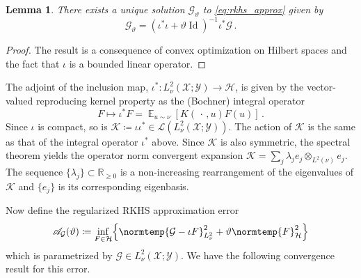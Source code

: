 \documentclass{article}
\theoremstyle{plain}
\newtheorem{lemma}[theorem]{Lemma}
\theoremstyle{my_def}
\theoremstyle{my_rem}
\numberwithin{equation}{section}
\numberwithin{theorem}{section}%
\newcommand{\R}{\mathbb{R}}
\newcommand{\E}{\mathbb{E}}
\newcommand{\scrA}{\mathscr{A}}
\newcommand{\cG}{\mathcal{G}}
\newcommand{\cH}{\mathcal{H}}
\newcommand{\cK}{\mathcal{K}}
\newcommand{\cL}{\mathcal{L}}
\newcommand{\cX}{\mathcal{X}}
\newcommand{\cY}{\mathcal{Y}}
\let\originalleft\left %
\let\originalright\right
\renewcommand{\left}{\mathopen{}\mathclose\bgroup\originalleft}
\renewcommand{\right}{\aftergroup\egroup\originalright}
\newcommand{\norm}{\normtemp}
\newcommand{\slot}{{\,\cdot\,}}
\newcommand{\defeq}{\coloneqq} %
\DeclareMathOperator{\Id}{Id} %
\renewcommand{\E}{\operatorname{\mathbb{E}}} %
\begin{document}
\begin{lemma}
\label{lem:rkhs_approx_soln}
    There exists a unique solution $\cG_\vartheta$ to \eqref{eq:rkhs_approx} given by
    \begin{equation}\label{eq:rkhs_approx_soln}
        \cG_\vartheta = (\iota^*\iota + \vartheta \Id)^{-1}\iota^*\cG\,.
    \end{equation}
\end{lemma}
\begin{proof}
    The result is a consequence of convex optimization on Hilbert spaces and the fact that $\iota$ is a bounded linear operator.
\end{proof}

The adjoint of the inclusion map, $\iota^*\colon L^2_\nu(\cX;\cY)\to \cH$, is given by the vector-valued reproducing kernel property as the (Bochner) integral operator
\begin{equation}\label{eq:app_rkhs_cov}
    F\mapsto \iota^*F=\E_{u\sim\nu}[K(\slot,u)F(u)]\,.
\end{equation}
Since $\iota$ is compact, so is $\cK\defeq \iota\iota^*\in\cL(L^2_\nu(\cX;\cY))$. The action of $\cK$ is the same as that of the integral operator $\iota^*$ above. Since $\cK$ is also symmetric, the spectral theorem yields the operator norm convergent expansion $\cK=\sum_j\lambda_je_j\otimes_{L^2(\nu)}e_j$. The sequence $\{\lambda_j\}\subset \R_{\geq 0}$ is a non-increasing rearrangement of the eigenvalues of $\cK$ and $\{e_j\}$ is its corresponding eigenbasis. 

Now define the regularized RKHS approximation error
\begin{equation}\label{eq:scrA_rkhs}
    \scrA_\cG(\vartheta)\defeq \inf_{F\in\cH}\left\{\norm{\cG - \iota F}_{L^2_\nu}^2 + \vartheta \norm{F}_{\cH}^2\right\}
\end{equation}
which is parametrized by $\cG\in L^2_\nu(\cX;\cY)$. We have the following convergence result for this error.
\end{document}
